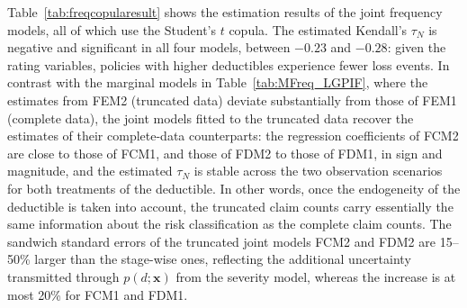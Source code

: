 \documentclass[11pt]{article}
\newcommand{\rev}[1]{{\color{blue}#1}}
\begin{document}
\rev{Table~\ref{tab:freqcopularesult} shows the estimation results of the joint frequency models, all of which use the Student's $t$ copula. The estimated Kendall's $\tau_N$ is negative and significant in all four models, between $-0.23$ and $-0.28$: given the rating variables, policies with higher deductibles experience fewer loss events. In contrast with the marginal models in Table~\ref{tab:MFreq_LGPIF}, where the estimates from FEM2 (truncated data) deviate substantially from those of FEM1 (complete data), the joint models fitted to the truncated data recover the estimates of their complete-data counterparts: the regression coefficients of FCM2 are close to those of FCM1, and those of FDM2 to those of FDM1, in sign and magnitude, and the estimated $\tau_N$ is stable across the two observation scenarios for both treatments of the deductible. In other words, once the endogeneity of the deductible is taken into account, the truncated claim counts carry essentially the same information about the risk classification as the complete claim counts. The sandwich standard errors of the truncated joint models FCM2 and FDM2 are 15--50\% larger than the stage-wise ones, reflecting the additional uncertainty transmitted through $p(d;\bm{x})$ from the severity model, whereas the increase is at most 20\% for FCM1 and FDM1.}
\end{document}

